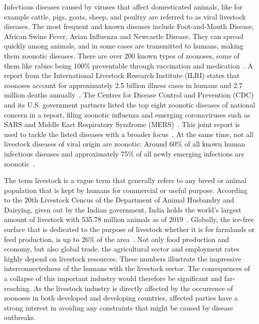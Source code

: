 Infectious diseases caused by viruses that affect domesticated animals, like for example cattle, pigs, goats, sheep, and poultry are referred to as viral livestock diseases. The most frequent and known diseases include Foot-and-Mouth Disease, African Swine Fever, Avian Influenza and Newcastle Disease. They can spread quickly among animals, and in some cases are transmitted to humans, making them zoonotic diseases. There are over 200 known types of zoonoses, some of them like rabies being 100\% preventable through vaccination and medication~\cite{who2020zoon}. A report from the International Livestock Research Institute (ILRI) states that zoonoses account for approximately 2.5 billion illness cases in humans and 2.7 million deaths annually~\cite{grace2012mapping}. The Centres for Disease Control and Prevention (CDC) and its U.S. government partners listed the top eight zoonotic diseases of national concern in a report, filing zoonotic influenza and emerging coronaviruses such as SARS and Middle East Respiratory Syndrome (MERS)~\cite{brown2006recent}. This joint report is used to tackle the listed diseases with a broader focus~\cite{centers8zoonotic}. At the same time, not all livestock diseases of viral origin are zoonotic: Around 60\% of all known human infectious diseases and approximately 75\% of all newly emerging infections are zoonotic~\cite{jones2008global}.

The term livestock is a vague term that generally refers to any breed or animal population that is kept by humans for commercial or useful purpose. According to the 20th Livestock Cencus of the Department of Animal Husbandry and Dairying, given out by the Indian government, India holds the world's largest amount of livestock with 535.78 million animals as of 2019~\cite{livestock2019}. Globally, the ice-free surface that is dedicated to the purpose of livestock whether it is for farmlands or feed production, is up to 26\% of the area~\cite{steinfeld2006livestock}. Not only food production and economy, but also global trade, the agricultural sector and employment rates highly depend on livestock resources. These numbers illustrate the impressive interconnectedness of the humans with the livestock sector. The consequences of a collapse of this important industry would therefore be significant and far-reaching. As the livestock industry is directly affected by the occurrence of zoonoses in both developed and developing countries, affected parties have a strong interest in avoiding any constraints that might be caused by disease outbreaks.

